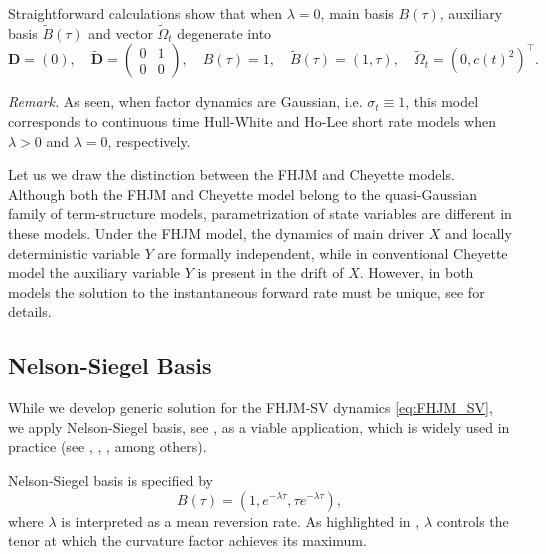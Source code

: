 \documentclass[pdftex,11pt,a4paper] {article}
\begin{document}
Straightforward calculations show that when $\lambda=0$, main basis $B(\tau)$, auxiliary basis $\tilde{B}(\tau)$ and vector $\tilde{\Omega}_t$ degenerate into
\begin{equation}\label{eq:one_factor_PE_Ho_Lee}
\mathbf{D}=(0),\quad \tilde{\mathbf{D}}=
\begin{pmatrix}
0 & 1 \\
 0 & 0  
\end{pmatrix},
\quad B(\tau)=1,\quad \tilde B(\tau)=\left(1, \tau\right),\quad 
\tilde\Omega_t=\left(0,c(t)^2\right)^\top.
\end{equation}

{\it Remark.} As seen, when factor dynamics are Gaussian, i.e. $\sigma_t\equiv 1$, this model corresponds to continuous time Hull-White and Ho-Lee short rate models when $\lambda>0$ and $\lambda=0$, respectively. 


Let us  we draw the distinction between the FHJM and Cheyette models. Although both the FHJM and Cheyette model belong to the quasi-Gaussian family of term-structure models, para\-met\-ri\-za\-tion of state variables are different in these models. Under the FHJM model, the dynamics of main driver $X$ and locally deterministic variable $Y$ are formally independent, while in conventional Cheyette model the auxiliary variable $Y$ is present in the drift of $X$. However, in both models the solution to the instantaneous forward rate must be unique, see \cite{Lyashenko2023} for details. 




\subsection{Nelson-Siegel Basis}\label{sec:NS_basis}

While we develop generic solution for the FHJM-SV dynamics \eqref{eq:FHJM_SV}, we apply Nelson-Siegel basis, see \cite{NS1987}, as a viable application, which is widely used in practice (see \cite{Filipovic1999}, \cite{DieboldLi2006}, \cite{ChristensenDiebold2009,ChristensenDiebold2011}, among others).


Nelson-Siegel basis is specified by
\begin{equation}\label{eq:NS_basis}
B(\tau)=\left(1,e^{-\lambda\tau}, \tau e^{-\lambda\tau}\right),
\end{equation}
where $\lambda$ is interpreted as a mean reversion rate. As highlighted in \cite{DieboldLi2006}, $\lambda$ controls the tenor at which the curvature factor achieves its maximum. 
\end{document}
